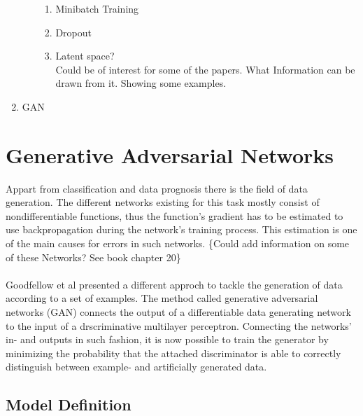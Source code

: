 \documentclass[12pt]{article}
\begin{document}
\begin{enumerate}
\begin{enumerate}
\begin{enumerate}
      \item Minibatch Training

      \item Dropout

      \item Latent space? \\
        Could be of interest for some of the papers.
        What Information can be drawn from it. Showing some examples.

    \end{enumerate}

  \end{enumerate}

  \item GAN
\end{enumerate}


\section{Generative Adversarial Networks}

Appart from classification and data prognosis there is the field of data generation.
The different networks existing for this task mostly consist of nondifferentiable functions, thus the function's gradient has to be estimated to use backpropagation during the network's training process.
This estimation is one of the main causes for errors in such networks.
\{Could add information on some of these Networks? See book chapter 20\}
\\
\\
Goodfellow et al \cite{1} presented a different approch to tackle the generation of data according to a set of examples.
The method called generative adversarial networks (GAN) connects the output of a differentiable data generating network to the input of a drscriminative multilayer perceptron.
Connecting the networks' in- and outputs in such fashion, it is now possible to train the generator by minimizing the probability that the attached discriminator is able to correctly distinguish between example- and artificially generated data.


  \subsection{Model Definition}
\end{document}
